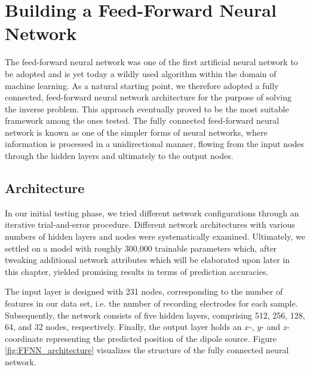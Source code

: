 \documentclass[a4paper, UKenglish, 11pt]{uiomaster}
\begin{document}
\section{Building a Feed-Forward Neural Network}
The feed-forward neural network was one of the first artificial neural network to be adopted and is yet today a wildly used algorithm within the domain of machine learning. As a natural starting point, we therefore adopted a fully connected, feed-forward neural network architecture for the purpose of solving the inverse problem. This approach eventually proved to be the most suitable framework among the ones tested. The fully connected feed-forward neural network is known as one of the simpler forms of neural networks, where information is processed in a unidirectional manner, flowing from the input nodes through the hidden layers and ultimately to the output nodes.



\subsection{Architecture}


In our initial testing phase, we tried different network configurations through an
iterative trial-and-error procedure. Different network architectures with various numbers of hidden layers and nodes were systematically examined. Ultimately, we settled on a model with roughly 300,000 trainable parameters which, after tweaking additional network attributes which will be elaborated upon later in this chapter, yielded promising results in terms of prediction accuracies.

The input layer is designed with 231 nodes, corresponding to the number of features in our data set, i.e. the number of recording electrodes for each sample. Subsequently, the network consists of five hidden layers, comprising 512, 256, 128, 64, and 32 nodes, respectively. Finally, the output layer holds an $x$-, $y$- and $z$-coordinate representing the predicted position of the dipole source. Figure \ref{fig:FFNN_architecture} visualizes the structure of the fully connected neural network.
\end{document}
